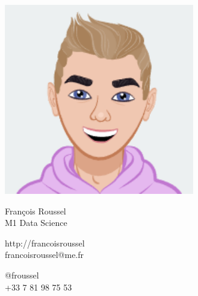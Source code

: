 \documentclass{article}
\begin{document}
\centering \includegraphics[width=.25\linewidth]{logo}\\[3pt]
\parbox{2in}{\Large \centering François Roussel\\[1pt]
\normalsize M1 Data Science}

\vfill
\raggedright
\begin{multicols}{2}
http://francoisroussel\\
francoisroussel@me.fr

\columnbreak
\raggedleft
@froussel\\
+33 7 81 98 75 53%
\end{multicols}%
\end{document}
